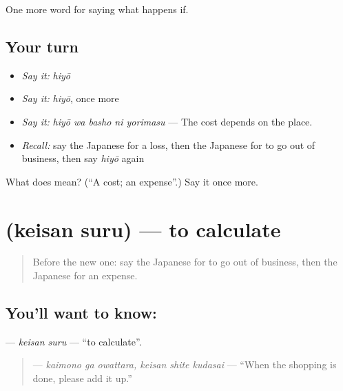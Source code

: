 \begin{grammarlens}[title={What you've built}]
One more word for saying what happens if.
\end{grammarlens}

\subsection*{Your turn}
\begin{itemize}
\raggedright
  \item \emph{Say it:} \emph{hiyō}
  \item \emph{Say it:} \emph{hiyō}, once more
  \item \emph{Say it:} \emph{hiyō wa basho ni yorimasu} — The cost depends on the place.
  \item \emph{Recall:} say the Japanese for a loss, then the Japanese for to go out of business, then say \emph{hiyō} again
\end{itemize}

\begin{tcolorbox}[breakable,colback=teal!4,colframe=teal!35!black,title={Before you move on}]
What does  mean? (\textquotedblleft{}A cost; an expense\textquotedblright{}.) Say it once more.
\end{tcolorbox}
\section[\texorpdfstring{\ja{けいさんする} (keisan suru)}{けいさんする (keisan suru)}]{ (keisan suru) — to calculate}

\label{lesson:JA-C362-keisan-suru}



\begin{quote}
Before the new one: say the Japanese for to go out of business, then the Japanese for an expense.
\end{quote}

\subsection*{You'll want to know: }
\textbf{} — \emph{keisan suru} — \textquotedblleft{}to calculate\textquotedblright{}.

\begin{quote}
\textbf{  } — \emph{kaimono ga owattara, keisan shite kudasai} — \textquotedblleft{}When the shopping is done, please add it up.\textquotedblright{}
\end{quote}

